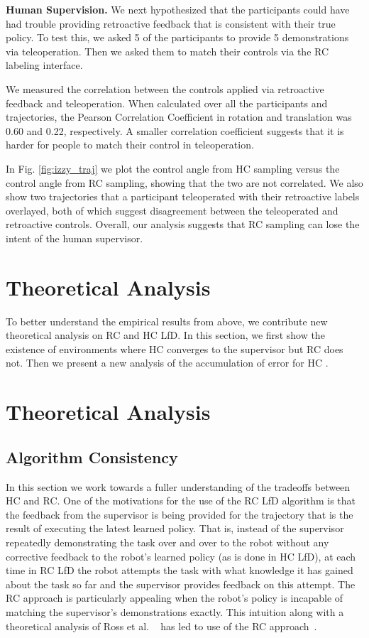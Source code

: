 \documentclass[10pt, conference]{ieeeconf}      %
\newcommand{\ns}{HC }
\begin{document}
\noindent\textbf{Human Supervision. }We next hypothesized that the participants could have had trouble providing retroactive feedback that is consistent with their true policy. To test this, we asked 5 of the participants to provide 5 demonstrations via teleoperation. Then we asked them to match their controls via the RC labeling interface. 

We measured the correlation between the controls applied via retroactive feedback and teleoperation. When calculated over all the participants and trajectories, the Pearson Correlation Coefficient in rotation and translation was 0.60 and 0.22, respectively. A smaller correlation coefficient suggests that it is harder for people to match their control in teleoperation. 

In Fig. \ref{fig:izzy_traj} we plot the control angle from HC sampling versus the control angle from RC sampling, showing that the two are not correlated. We also show two trajectories that a participant teleoperated with their retroactive labels overlayed, both of which suggest disagreement between the teleoperated and retroactive controls. Overall, our analysis suggests that RC sampling can lose the intent of the human supervisor. 

\section{Theoretical Analysis}
To better understand the empirical results from above, we contribute new theoretical analysis on RC and HC LfD. In this section, we first show the existence of environments where HC converges to the supervisor but RC does not. Then we present a new analysis of the accumulation of error for \ns. 


\section{Theoretical Analysis} 

\subsection{Algorithm Consistency}\label{sec:consistent}
In this section we work towards a fuller understanding of the tradeoffs between HC and RC. 
One of the motivations for the use of the RC LfD algorithm is that the feedback from the supervisor is being provided for the trajectory that is the result of executing the latest learned policy.
That is, instead of the supervisor repeatedly demonstrating the task over and over to the robot without any corrective feedback to the robot's learned policy (as is done in HC LfD), at each time in RC LfD the robot attempts the task with what knowledge it has gained about the task so far and the supervisor provides feedback on this attempt. 
The RC approach is particularly appealing when the robot's policy is incapable of matching the supervisor's demonstrations exactly.  
This intuition along with a theoretical analysis of Ross et al. ~\cite{ross2010reduction} has led to use of the RC approach~\cite{zhang2016query,he2012imitation,ross2013learning}.
\end{document}
